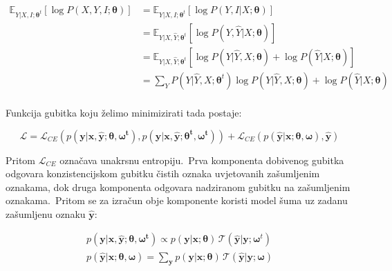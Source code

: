 \documentclass[diplomskirad]{fer}
\begin{document}
\begin{equation}
  \begin{aligned}
    \mathbb{E}_{Y | X, I; \bm{\theta}^t} \left[ \log P(X, Y, I; \bm{\theta}) \right] &= \mathbb{E}_{Y | X, I; \bm{\theta}^t} \left[ \log P(Y, I | X; \bm{\theta}) \right] \\
    &= \mathbb{E}_{Y | X, \hat{Y}; \bm{\theta}^t} \left[ \log P(Y, \hat{Y} | X; \bm{\theta}) \right] \\
    &= \mathbb{E}_{Y | X, \hat{Y}; \bm{\theta}^t} \left[ \log P(Y | \hat{Y}, X; \bm{\theta}) + \log P(\hat{Y} | X; \bm{\theta}) \right] \\
    &= \sum_{Y} P(Y | \hat{Y}, X; \bm{\theta}^t) \log P(Y | \hat{Y}, X; \bm{\theta}) + \log P(\hat{Y} | X; \bm{\theta}) \\
  \end{aligned}
  \label{eq:ill_target}
\end{equation}

Funkcija gubitka koju želimo minimizirati tada postaje:

\begin{equation}
  \mathcal{L} = \mathcal{L}_{CE} (p(\bm{y} | \bm{x}, \bm{\hat{y}; \bm{\theta}, \bm{\omega}^t}), p(\bm{y} | \bm{x}, \bm{\hat{y}; \bm{\theta}^t, \bm{\omega}^t})) + \mathcal{L}_{CE} (p(\bm{\hat{y}} | \bm{x}; \bm{\theta}, \bm{\omega}), \bm{\hat{y}})
  \label{eq:ill_loss}
\end{equation}

Pritom $\mathcal{L}_{CE}$ označava unakrsnu entropiju.\ Prva komponenta dobivenog gubitka odgovara konzistencijskom gubitku čistih oznaka uvjetovanih zašumljenim oznakama, dok druga komponenta odgovara nadziranom gubitku na zašumljenim oznakama.\ 
Pritom se za izračun obje komponente koristi model šuma uz zadanu zašumljenu oznaku $\bm{\hat{y}}$:

\begin{equation}
  \begin{aligned}
    p(\bm{y} | \bm{x}, \bm{\hat{y}; \bm{\theta}, \bm{\omega}^t}) \propto p(\bm{y} | \bm{x}; \bm{\theta}) \, \mathcal{T}(\bm{\hat{y}} | \bm{y}; \bm{\omega}^t) \\
    p(\bm{\hat{y}} | \bm{x}; \bm{\theta}, \bm{\omega}) = \sum_{\bm{y}} p(\bm{y} | \bm{x}; \bm{\theta}) \, \mathcal{T}(\bm{\hat{y}} | \bm{y}; \bm{\omega})
  \end{aligned}
  \label{eq:ill_probs}
\end{equation}

\end{document}
